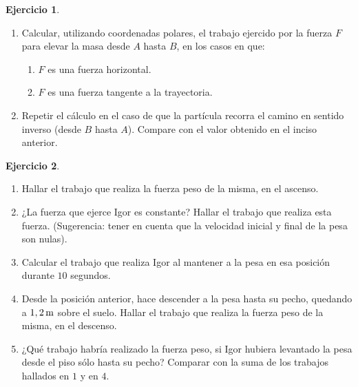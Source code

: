 \documentclass[a4paper,12pt,twoside]{book}
\newtheorem{ejercicio}{{Ejercicio}}[chapter]
\begin{document}
\begin{mdframed}[style=ejercicio-dificil]
    \begin{ejercicio}
    \end{ejercicio}
    \begin{enumerate}
        \item Calcular, utilizando coordenadas polares, el trabajo ejercido por la fuerza $F$ para elevar la masa
        desde $A$ hasta $B$, en los casos en que:
        \begin{enumerate}
            \item $F$ es una fuerza horizontal.
            \item $F$ es una fuerza tangente a la trayectoria.
        \end{enumerate}
        \item Repetir el cálculo en el caso de que la partícula recorra el camino en sentido inverso (desde $B$
        hasta $A$). Compare con el valor obtenido en el inciso anterior.
    \end{enumerate}
    \begin{center}
        \def\svgwidth{0.5\linewidth}
        
    \end{center}
\end{mdframed}

\begin{mdframed}[style=ejercicio-intermedio]
    \begin{ejercicio}
    \end{ejercicio}
    \begin{enumerate}
        \item Hallar el trabajo que realiza la fuerza peso de la misma, en el ascenso.
        \item ¿La fuerza que ejerce Igor es constante? Hallar el trabajo que realiza esta fuerza. (Sugerencia:
        tener en cuenta que la velocidad inicial y final de la pesa son nulas).
        \item Calcular el trabajo que realiza Igor al mantener a la pesa en esa posición durante $10$ segundos.
        \item Desde la posición anterior, hace descender a la pesa hasta su pecho, quedando a $1,2\, \si{\metre}$ sobre el
        suelo. Hallar el trabajo que realiza la fuerza peso de la misma, en el descenso.
        \item ¿Qué trabajo habría realizado la fuerza peso, si Igor hubiera levantado la pesa desde el piso sólo
        hasta su pecho? Comparar con la suma de los trabajos hallados en $1$ y en $4$.
    \end{enumerate}
\end{mdframed}
\end{document}
